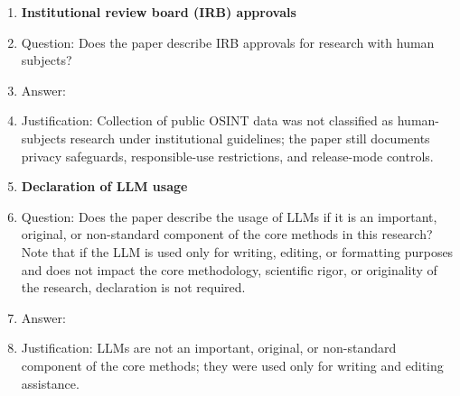 \documentclass{article}
\begin{document}
\begin{enumerate}
\item {\bf Institutional review board (IRB) approvals}
    \item[] Question: Does the paper describe IRB approvals for research with human subjects?
    \item[] Answer: \answerNA{}
    \item[] Justification: Collection of public OSINT data was not classified as human-subjects research under institutional guidelines; the paper still documents privacy safeguards, responsible-use restrictions, and release-mode controls.

\item {\bf Declaration of LLM usage}
    \item[] Question: Does the paper describe the usage of LLMs if it is an important, original, or non-standard component of the core methods in this research? Note that if the LLM is used only for writing, editing, or formatting purposes and does not impact the core methodology, scientific rigor, or originality of the research, declaration is not required.
    \item[] Answer: \answerNA{}
    \item[] Justification: LLMs are not an important, original, or non-standard component of the core methods; they were used only for writing and editing assistance.

\end{enumerate}
\end{document}
